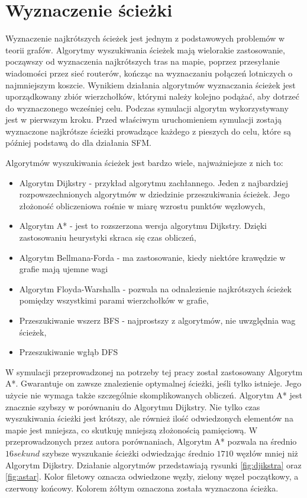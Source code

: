 \chapter{Wyznaczenie ścieżki}
\label{cha:wyznaczenieSciezki}

Wyznaczenie najkrótszych ścieżek jest jednym z podstawowych problemów w teorii grafów. Algorytmy wyszukiwania ścieżek mają wielorakie zastosowanie, począwszy od wyznaczenia najkrótszych tras na mapie, poprzez przesyłanie wiadomości przez sieć routerów, kończąc na wyznaczaniu połączeń lotniczych o najmniejszym koszcie. Wynikiem działania algorytmów wyznaczania ścieżek jest uporządkowany zbiór wierzchołków, którymi należy kolejno podążać, aby dotrzeć do wyznaczonego wcześniej celu. Podczas symulacji algorytm wykorzystywany jest w pierwszym kroku. Przed właściwym uruchomieniem symulacji zostają wyznaczone najkrótsze ścieżki prowadzące każdego z pieszych do celu, które są później podstawą do dla działania SFM.

Algorytmów wyszukiwania ścieżek jest bardzo wiele, najważniejsze z nich to:

\begin{itemize}
\item Algorytm Dijkstry - przykład algorytmu zachłannego. Jeden z najbardziej rozpowszechnionych algorytmów w dziedzinie przeszukiwania ścieżek. Jego złożoność obliczeniowa rośnie w miarę wzrostu punktów węzłowych,
\item Algorytm A* - jest to rozszerzona wersja algorytmu Dijkstry. Dzięki zastosowaniu heurystyki skraca się czas obliczeń,
\item Algorytm Bellmana-Forda - ma zastosowanie, kiedy niektóre krawędzie w grafie mają ujemne wagi
\item Algorytm Floyda-Warshalla - pozwala na odnalezienie najkrótszych ścieżek pomiędzy wszystkimi parami wierzchołków w grafie,
\item Przeszukiwanie wszerz BFS - najprostszy z algorytmów, nie uwzględnia wag ścieżek,
\item Przeszukiwanie wgłąb DFS
\end{itemize}

W symulacji przeprowadzonej na potrzeby tej pracy został zastosowany Algorytm A*. Gwarantuje on zawsze znalezienie optymalnej ścieżki, jeśli tylko istnieje. Jego użycie nie wymaga także szczególnie skomplikowanych obliczeń. Algorytm A* jest znacznie szybszy w porównaniu do Algorytmu Dijkstry. Nie tylko czas wyszukiwania ścieżki jest krótszy, ale również ilość odwiedzonych elementów na mapie jest mniejsza, co skutkuję mniejszą złożonością pamięciową. W przeprowadzonych przez autora porównaniach, Algorytm A* pozwala na średnio $16 sekund$ szybsze wyszukanie ścieżki odwiedzając średnio $1710$ węzłów mniej niż Algorytm Dijkstry. Działanie algorytmów przedstawiają rysunki \ref{fig:djikstra} oraz \ref{fig:astar}. Kolor filetowy oznacza odwiedzone węzły, zielony węzeł początkowy, a czerwony końcowy. Kolorem żółtym oznaczona została wyznaczona ścieżka.

